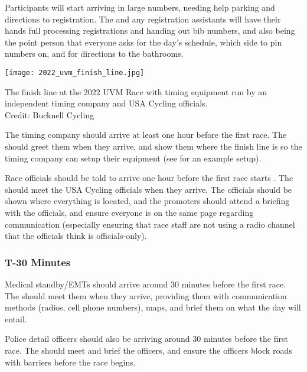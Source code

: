 Participants will start arriving in large numbers, needing help parking and directions to registration.
The  and any registration assistants will have their hands full processing registrations and handing out bib numbers,
and also being the point person that everyone asks for the day's schedule, which side to pin numbers on, and for directions to the bathrooms.

\begin{marginfigure}
  \texttt{[image: 2022\_uvm\_finish\_line.jpg]}
  \caption[A finish line setup with equipment, timing company, and USA Cycling officials]{The finish line at the 2022 UVM Race with timing equipment run by an independent timing company and
            USA Cycling officials.\\
            Credit: Bucknell Cycling}
\end{marginfigure}

The timing company should arrive at least one hour before the first race.
The  should greet them when they arrive,
and show them where the finish line is so the timing company can setup their equipment (see  for an example setup).

Race officials should be told to arrive one hour before the first race starts%
.
The  should meet the USA Cycling officials when they arrive.
The officials should be shown where everything is located, and the promoters should attend a briefing with the officials,
and ensure everyone is on the same page regarding communication (especially ensuring that race staff are not using a radio channel that the officials think is officials-only).

\subsubsection{T-30 Minutes}

Medical standby/EMTs should arrive around 30 minutes before the first race.
The  should meet them when they arrive,
providing them with communication methods (radios, cell phone numbers), maps, and brief them on what the day will entail.

Police detail officers should also be arriving around 30 minutes before the first race.
The  should meet and brief the officers, and ensure the officers block roads with barriers
before the race begins.

